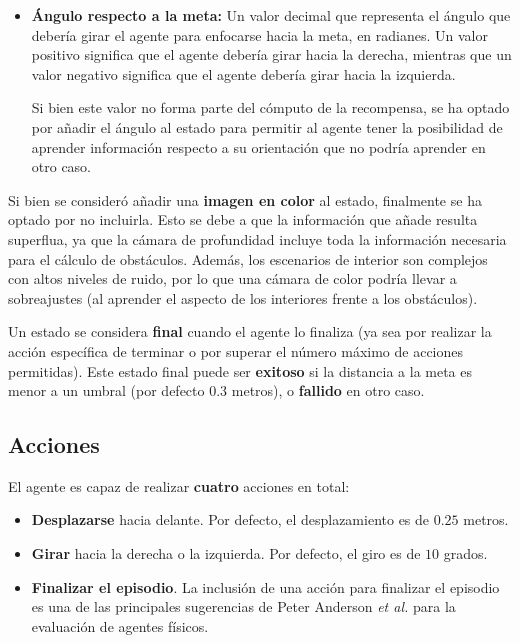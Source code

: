 \begin{itemize}
	\item \textbf{Ángulo respecto a la meta:} Un valor decimal que representa el ángulo que debería girar el agente para enfocarse hacia la meta, en radianes. Un valor positivo significa que el agente debería girar hacia la derecha, mientras que un valor negativo significa que el agente debería girar hacia la izquierda.
	
	Si bien este valor no forma parte del cómputo de la recompensa, se ha optado por añadir el ángulo al estado para permitir al agente tener la posibilidad de aprender información respecto a su orientación que no podría aprender en otro caso.
\end{itemize}

Si bien se consideró añadir una \textbf{imagen en color} al estado, finalmente se ha optado por no incluirla. Esto se debe a que la información que añade resulta superflua, ya que la cámara de profundidad incluye toda la información necesaria para el cálculo de obstáculos. Además, los escenarios de interior son complejos con altos niveles de ruido, por lo que una cámara de color podría llevar a sobreajustes (al aprender el aspecto de los interiores frente a los obstáculos).

Un estado se considera \textbf{final} cuando el agente lo finaliza (ya sea por realizar la acción específica de terminar o por superar el número máximo de acciones permitidas). Este estado final puede ser \textbf{exitoso} si la distancia a la meta es menor a un umbral (por defecto $0.3$ metros), o \textbf{fallido} en otro caso.

\subsection{Acciones}

El agente es capaz de realizar \textbf{cuatro} acciones en total:

\begin{itemize}
	\item \textbf{Desplazarse} hacia delante. Por defecto, el desplazamiento es de $0.25$ metros.
	\item \textbf{Girar} hacia la derecha o la izquierda. Por defecto, el giro es de $10$ grados.
	\item \textbf{Finalizar el episodio}. La inclusión de una acción para finalizar el episodio es una de las principales sugerencias de Peter Anderson \textit{et al.} \cite{DBLP:journals/corr/abs-1807-06757} para la evaluación de agentes físicos.
\end{itemize}

